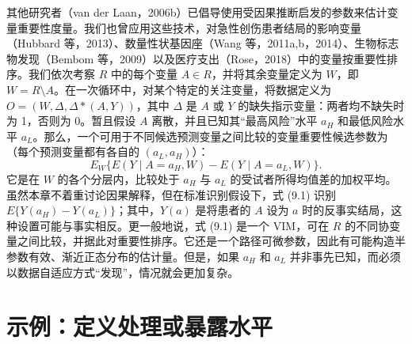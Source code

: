 其他研究者（van der Laan，2006b）已倡导使用受因果推断启发的参数来估计变量重要性度量。我们也曾应用这些技术，对急性创伤患者结局的影响变量（Hubbard 等，2013）、数量性状基因座（Wang 等，2011a,b，2014）、生物标志物发现（Bembom 等，2009）以及医疗支出（Rose，2018）中的变量按重要性排序。我们依次考察 $R$ 中的每个变量 $A\in R$，并将其余变量定义为 $W$，即 $W=R\setminus A$。在一次循环中，对某个特定的关注变量，将数据定义为 $O=(W,\Delta,\Delta*(A,Y))$，其中 $\Delta$ 是 $A$ 或 $Y$ 的缺失指示变量：两者均不缺失时为 1，否则为 0。暂且假设 $A$ 离散，并且已知其“最高风险”水平 $a_H$ 和最低风险水平 $a_L$。那么，一个可用于不同候选预测变量之间比较的变量重要性候选参数为（每个预测变量都有各自的 $(a_L,a_H)$）：
\begin{equation}
E_W\{E(Y\mid A=a_H,W)-E(Y\mid A=a_L,W)\}.
\tag{9.1}
\end{equation}
它是在 $W$ 的各个分层内，比较处于 $a_H$ 与 $a_L$ 的受试者所得均值差的加权平均。虽然本章不着重讨论因果解释，但在标准识别假设下，式 (9.1) 识别 $E\{Y(a_H)-Y(a_L)\}$；其中，$Y(a)$ 是将患者的 $A$ 设为 $a$ 时的反事实结局，这种设置可能与事实相反。更一般地说，式 (9.1) 是一个 VIM，可在 $R$ 的不同协变量之间比较，并据此对重要性排序。它还是一个路径可微参数，因此有可能构造半参数有效、渐近正态分布的估计量。但是，如果 $a_H$ 和 $a_L$ 并非事先已知，而必须以数据自适应方式“发现”，情况就会更加复杂。

\section{示例：定义处理或暴露水平}

